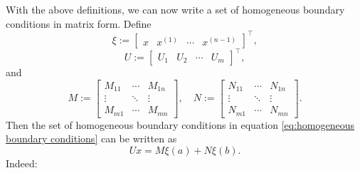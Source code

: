 \documentclass[12pt, oneside, a4paper]{article}
\begin{document}
With the above definitions, we can now write a set of homogeneous boundary conditions in matrix form. Define
\begin{equation}\label{eq:xi}
\xi := \begin{bmatrix}x & x^{(1)} & \cdots & x^{(n-1)}\end{bmatrix}^\intercal,
\end{equation}
\begin{equation}\label{eq:U}
U := \begin{bmatrix}U_1 & U_2 & \cdots & U_m\end{bmatrix}^\intercal,
\end{equation}
and 
\begin{equation}\label{eq:M, N}
    M := \begin{bmatrix}
        M_{11} & \cdots & M_{1n}\\
        \vdots & \ddots & \vdots\\
        M_{m1} & \cdots & M_{mn}
    \end{bmatrix},\quad
    N := \begin{bmatrix}
        N_{11} & \cdots & N_{1n}\\
        \vdots & \ddots & \vdots\\
        N_{m1} & \cdots & N_{mn}
    \end{bmatrix}.
\end{equation}
Then the set of homogeneous boundary conditions in equation \eqref{eq:homogeneous boundary conditions} can be written as
\begin{equation}\label{eq:Ux=Mxi(a)+Nxi(b)}
    Ux = M\xi(a) + N\xi(b).
\end{equation}
Indeed:
\end{document}
